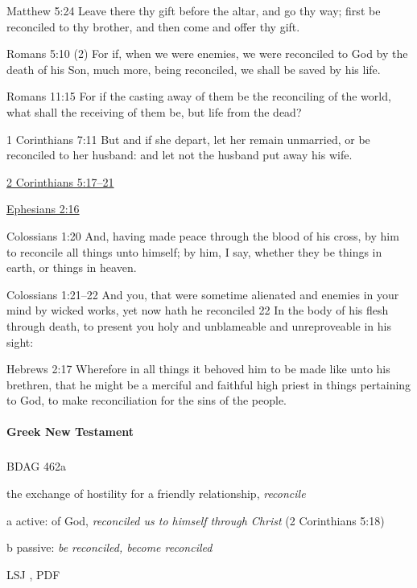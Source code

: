 			\begin{compactdesc}
				\item[Matthew 5:24] Leave there thy gift before the altar, and go thy way; first be reconciled to thy brother, and then come and offer thy gift.
				\item[Romans 5:10 (2)] For if, when we were enemies, we were reconciled to God by the death of his Son, much more, being reconciled, we shall be saved by his life.
				\item[Romans 11:15] For if the casting away of them be the reconciling of the world, what shall the receiving of them be, but life from the dead?
				\item[1 Corinthians 7:11] But and if she depart, let her remain unmarried, or be reconciled to her husband: and let not the husband put away his wife.
				\item[{\hyperref[2CORINTHIANS-5-17]{2 Corinthians 5:17--21}}]
				\item[{\hyperref[EPHESIANS-2-16]{Ephesians 2:16}}]
				\item[Colossians 1:20] And, having made peace through the blood of his cross, by him to reconcile all things unto himself; by him, I say, whether they be things in earth, or things in heaven.
				\item[Colossians 1:21--22] And you, that were sometime alienated and enemies in your mind by wicked works, yet now hath he reconciled 22  In the body of his flesh through death, to present you holy and unblameable and unreproveable in his sight:
				\item[Hebrews 2:17] Wherefore in all things it behoved him to be made like unto his brethren, that he might be a merciful and faithful high priest in things pertaining to God, to make reconciliation for the sins of the people.
			\end{compactdesc}
			
		\paragraph{Greek New Testament}
			\label{RECONCILIATION-GREEK}
		
			\subparagraph{\texorpdfstring{}{}}
				\label{KATALLASSO}
			
				\begin{compactdesc}
					\item[BDAG 462a] \textbf{}
						\begin{compactitem}
							\item the exchange of hostility for a friendly relationship, \textit{reconcile}
							\item[a] active: of God, \textit{reconciled us to himself through Christ} (2 Corinthians 5:18)
							\item[b] passive: \textit{be reconciled, become reconciled}
						\end{compactitem}
					\item[LSJ , PDF ] \textbf{}
						\begin{compactitem}
							\item 
						\end{compactitem}
				\end{compactdesc}
				
